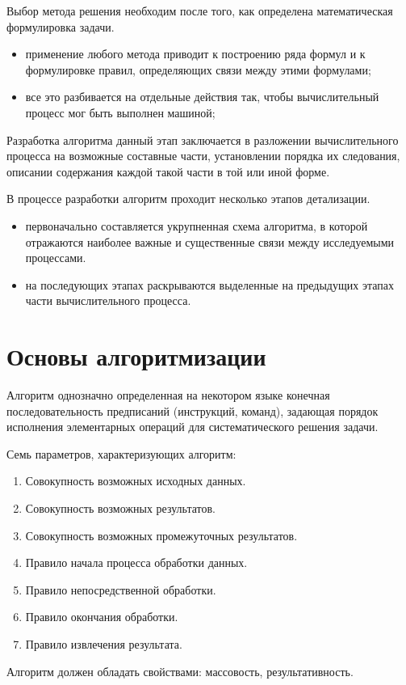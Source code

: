 \documentclass{beamer}
\begin{document}
\begin{frame}
\begin{block}{Выбор метода решения}
необходим после того, как определена математическая формулировка задачи.
\end{block}
\begin{itemize}
\item применение любого метода приводит к построению ряда формул и к формулировке правил, определяющих связи между этими формулами;
\item все это разбивается на отдельные действия так, чтобы вычислительный процесс мог быть выполнен машиной;
\end{itemize}
\end{frame}

\begin{frame}
\begin{block}{Разработка алгоритма}
данный этап заключается в разложении вычислительного процесса на возможные составные части, установлении порядка их следования, описании содержания каждой такой части в той или иной форме.
\end{block}
В процессе разработки алгоритм проходит несколько этапов детализации. 
\begin{itemize}
\item первоначально составляется укрупненная схема алгоритма, в которой отражаются наиболее важные и существенные  связи между исследуемыми процессами. 
\item на последующих этапах раскрываются выделенные на предыдущих этапах части вычислительного процесса.
\end{itemize}
\end{frame}

\section{Основы алгоритмизации}
\begin{frame}
\begin{block}{Алгоритм}
однозначно определенная на некотором языке конечная последовательность предписаний (инструкций, команд), задающая порядок исполнения элементарных операций для систематического решения задачи.
\end{block}
Семь параметров, характеризующих алгоритм:
\begin{enumerate}
\item Совокупность возможных исходных данных.
\item Совокупность возможных результатов.
\item Совокупность возможных промежуточных результатов.
\item Правило начала процесса обработки данных.
\item Правило непосредственной обработки.
\item Правило окончания обработки.
\item Правило извлечения результата. 
\end{enumerate}
Алгоритм должен обладать свойствами: массовость, результативность. 
\end{frame}
\end{document}
